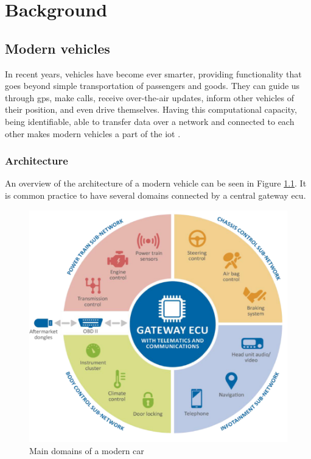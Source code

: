\chapter{Background}
\label{c:background}

\section{Modern vehicles}

In recent years, vehicles have become ever smarter, providing functionality that goes beyond simple transportation of passengers and goods. They can guide us through \gls{gps}, make calls, receive over-the-air updates, inform other vehicles of their position, and even drive themselves. Having this computational capacity, being identifiable, able to transfer data over a network and connected to each other makes modern vehicles a part of the \acrlong{iot} \citep{Lombardi2021}.\par

\subsection{Architecture}

An overview of the architecture of a modern vehicle can be seen in Figure \ref{fig:Car_Domains}. It is common practice to have several domains connected by a central gateway \gls{ecu}.

\begin{figure}
    \centering
    \includegraphics[width = .7\textwidth]{img/parts/introduction/Vehicle Architecture.png}
    \caption{Main domains of a modern car \citep{ENISA}}
    \label{fig:Car_Domains}
\end{figure}

